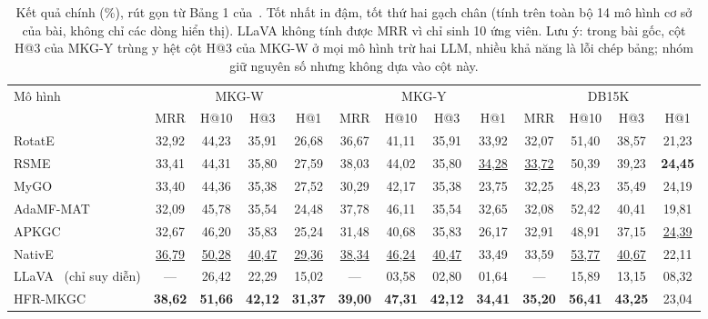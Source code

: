 \documentclass[conference,a4paper]{IEEEtran}
\begin{document}
\begin{table}[t]
\centering
\caption{Kết quả chính (\%), rút gọn từ Bảng 1 của~\cite{hfrmkgc}. Tốt nhất in đậm, tốt thứ hai gạch chân (tính trên toàn bộ 14 mô hình cơ sở của bài, không chỉ các dòng hiển thị). LLaVA không tính được MRR vì chỉ sinh 10 ứng viên. Lưu ý: trong bài gốc, cột H@3 của MKG-Y trùng y hệt cột H@3 của MKG-W ở mọi mô hình trừ hai LLM, nhiều khả năng là lỗi chép bảng; nhóm giữ nguyên số nhưng không dựa vào cột này.}
\label{tab:main}
\footnotesize
\setlength{\tabcolsep}{4.5pt}
\begin{tabular}{l cccc cccc cccc}
\toprule
\multirow{2}{*}{Mô hình} & \multicolumn{4}{c}{MKG-W} & \multicolumn{4}{c}{MKG-Y} & \multicolumn{4}{c}{DB15K}\\
\cmidrule(lr){2-5}\cmidrule(lr){6-9}\cmidrule(lr){10-13}
 & MRR & H@10 & H@3 & H@1 & MRR & H@10 & H@3 & H@1 & MRR & H@10 & H@3 & H@1\\
\midrule
RotatE~\cite{rotate}   & 32{,}92 & 44{,}23 & 35{,}91 & 26{,}68 & 36{,}67 & 41{,}11 & 35{,}91 & 33{,}92 & 32{,}07 & 51{,}40 & 38{,}57 & 21{,}23 \\
RSME~\cite{rsme}       & 33{,}41 & 44{,}31 & 35{,}80 & 27{,}59 & 38{,}03 & 44{,}02 & 35{,}80 & \underline{34{,}28} & \underline{33{,}72} & 50{,}39 & 39{,}23 & \textbf{24{,}45} \\
MyGO~\cite{mygo}       & 33{,}40 & 44{,}36 & 35{,}38 & 27{,}52 & 30{,}29 & 42{,}17 & 35{,}38 & 23{,}75 & 32{,}25 & 48{,}23 & 35{,}49 & 24{,}19 \\
AdaMF-MAT~\cite{adamf} & 32{,}09 & 45{,}78 & 35{,}54 & 24{,}48 & 37{,}78 & 46{,}11 & 35{,}54 & 32{,}65 & 32{,}08 & 52{,}42 & 40{,}41 & 19{,}81 \\
APKGC~\cite{apkgc}     & 32{,}67 & 46{,}20 & 35{,}83 & 25{,}24 & 31{,}48 & 40{,}68 & 35{,}83 & 26{,}17 & 32{,}91 & 48{,}91 & 37{,}15 & \underline{24{,}39} \\
NativE~\cite{native}   & \underline{36{,}79} & \underline{50{,}28} & \underline{40{,}47} & \underline{29{,}36} & \underline{38{,}34} & \underline{46{,}24} & \underline{40{,}47} & 33{,}49 & 33{,}59 & \underline{53{,}77} & \underline{40{,}67} & 22{,}11 \\
LLaVA~\cite{llava} (chỉ suy diễn) & --- & 26{,}42 & 22{,}29 & 15{,}02 & --- & 03{,}58 & 02{,}80 & 01{,}64 & --- & 15{,}89 & 13{,}15 & 08{,}32 \\
\midrule
HFR-MKGC~\cite{hfrmkgc} & \textbf{38{,}62} & \textbf{51{,}66} & \textbf{42{,}12} & \textbf{31{,}37} & \textbf{39{,}00} & \textbf{47{,}31} & \textbf{42{,}12} & \textbf{34{,}41} & \textbf{35{,}20} & \textbf{56{,}41} & \textbf{43{,}25} & 23{,}04 \\
\bottomrule
\end{tabular}
\end{table}
\end{document}
